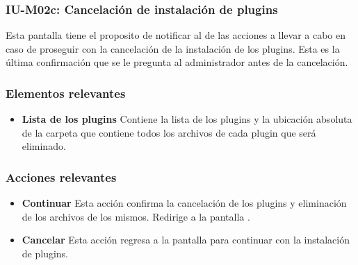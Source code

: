 
\subsubsection{IU-M02c: Cancelación de instalación de plugins}

 Esta pantalla tiene el proposito de notificar al  de las acciones a
 llevar a cabo en caso de proseguir con la cancelación de la instalación de los plugins. Esta es
 la última confirmación que se le pregunta al administrador antes de la cancelación.


\subsubsection{Elementos relevantes}

    \begin{itemize}
    \item {\bf Lista de los plugins}
        Contiene la lista de los plugins y la ubicación absoluta de la carpeta
        que contiene todos los archivos de cada plugin que será eliminado.
    \end{itemize}

\subsubsection{Acciones relevantes}

    \begin{itemize}
    \item {\bf Continuar}
        Esta acción confirma la cancelación de los plugins y eliminación de los
        archivos de los mismos. Redirige a la pantalla .

    \item {\bf Cancelar}
        Esta acción regresa a la pantalla  para continuar con la instalación
        de plugins.
    \end{itemize}

\clearpage
